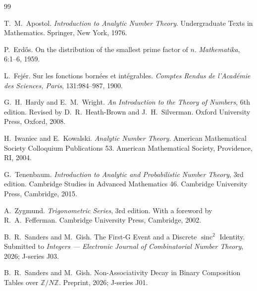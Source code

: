 \documentclass[11pt,reqno]{amsart}
\theoremstyle{plain}
\theoremstyle{definition}
\theoremstyle{remark}
\DeclareMathOperator{\sinc}{sinc}
\begin{document}
\begin{thebibliography}{99}

T.~M.~Apostol.
\newblock \emph{Introduction to Analytic Number Theory}.
\newblock Undergraduate Texts in Mathematics. Springer, New York, 1976.

P.~Erd\H{o}s.
\newblock On the distribution of the smallest prime factor of $n$.
\newblock \emph{Mathematika}, 6:1--6, 1959.

L.~Fej\'{e}r.
\newblock Sur les fonctions born\'{e}es et int\'{e}grables.
\newblock \emph{Comptes Rendus de l'Acad\'{e}mie des Sciences, Paris},
131:984--987, 1900.

G.~H.~Hardy and E.~M.~Wright.
\newblock \emph{An Introduction to the Theory of Numbers}, 6th edition.
\newblock Revised by D.~R.~Heath-Brown and J.~H.~Silverman.
\newblock Oxford University Press, Oxford, 2008.

H.~Iwaniec and E.~Kowalski.
\newblock \emph{Analytic Number Theory}.
\newblock American Mathematical Society Colloquium Publications 53.
\newblock American Mathematical Society, Providence, RI, 2004.

G.~Tenenbaum.
\newblock \emph{Introduction to Analytic and Probabilistic Number Theory},
3rd edition.
\newblock Cambridge Studies in Advanced Mathematics 46. Cambridge
University Press, Cambridge, 2015.

A.~Zygmund.
\newblock \emph{Trigonometric Series}, 3rd edition.
\newblock With a foreword by R.~A.~Fefferman.
\newblock Cambridge University Press, Cambridge, 2002.

B.~R.~Sanders and M.~Gish.
\newblock The First-G Event and a Discrete $\sinc^{2}$ Identity.
\newblock Submitted to \emph{Integers --- Electronic Journal of
Combinatorial Number Theory}, 2026; J-series J03.

B.~R.~Sanders and M.~Gish.
\newblock Non-Associativity Decay in Binary Composition Tables over
$\mathbb{Z}/N\mathbb{Z}$.
\newblock Preprint, 2026; J-series J01.

\end{thebibliography}
\end{document}
